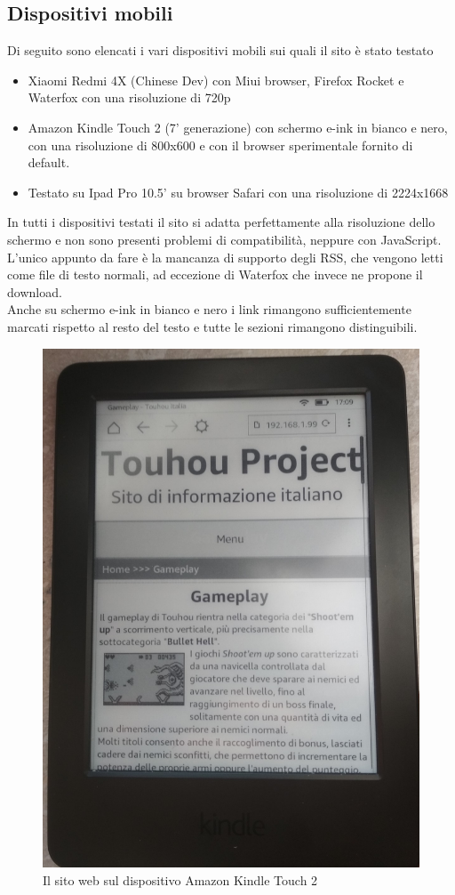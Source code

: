 \documentclass[openany, a4paper, 12pt]{report}
\begin{document}
				\subsection{Dispositivi mobili}
				Di seguito sono elencati i vari dispositivi mobili sui quali il sito è stato testato
				\begin{itemize}
				\item Xiaomi Redmi 4X (Chinese Dev) con Miui browser, Firefox Rocket e Waterfox con una risoluzione di 720p
				\item Amazon Kindle Touch 2 (7' generazione) con schermo e-ink in bianco e nero, con una risoluzione di 800x600 e con il browser sperimentale fornito di default.
        		\item Testato su Ipad Pro 10.5' su browser Safari con una risoluzione di 2224x1668 %
				\end{itemize}
			
				In tutti i dispositivi testati il sito si adatta perfettamente alla risoluzione dello schermo e non sono presenti problemi di compatibilità, neppure con JavaScript.\\
				L'unico appunto da fare è la mancanza di supporto degli RSS, che vengono letti come file di testo normali, ad eccezione di Waterfox che invece ne propone il download.\\
				Anche su schermo e-ink in bianco e nero i link rimangono sufficientemente marcati rispetto al resto del testo e tutte le sezioni rimangono distinguibili.
			
				\begin{figure}[H]
					\centering
					\includegraphics[width=0.7\linewidth]{images/Kindle}
					\caption{Il sito web sul dispositivo Amazon Kindle Touch 2}
				\end{figure}
			
\end{document}
